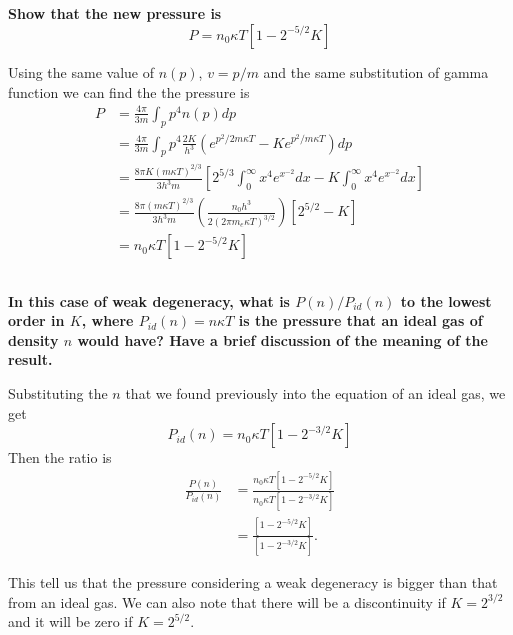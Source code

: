 \subsection{}
\textbf{Show that the new pressure is
\begin{equation}
    P = n_0\kappa T \left[1-2^{-5/2}K\right]
\end{equation}}

Using the same value of $n(p)$, $v=p/m$ and the same substitution of gamma function we can find the the pressure is
\begin{align*}
    P &= \frac{4\pi}{3m}\int_p p^4 n(p) dp\\
    &= \frac{4\pi}{3m}\int_p p^4 \frac{2K}{h^3}\left(e^{p^2/2m\kappa T}-Ke^{p^2/m\kappa T}\right) dp\\
    &= \frac{8\pi K(m\kappa T)^{2/3}}{3h^3m}\left[2^{5/3}\int_0^\infty x^4 e^{x^{-2}} dx - K\int_0^\infty x^4 e^{x^{-2}} dx\right]\\
    &= \frac{8\pi(m\kappa T)^{2/3}}{3h^3m}\left(\frac{n_0 h^3}{2(2\pi m_e \kappa T)^{3/2}}\right)\left[2^{5/2}-K\right]\\
    &= n_0\kappa T \left[1-2^{-5/2}K\right]
\end{align*}


\subsection{}
\textbf{In this case of weak degeneracy, what is $P(n)/P_{id}(n)$ to the lowest order in $K$, where $P_{id}(n) = n\kappa T$ is the pressure that an ideal gas of density $n$ would have?
Have a brief discussion of the meaning of the result.}

Substituting the $n$ that we found previously into the equation of an ideal gas, we get 
\begin{equation*}
    P_{id}(n) = n_0\kappa T \left[1-2^{-3/2}K\right]
\end{equation*}
 Then the ratio is
\begin{align*}
    \frac{P(n)}{P_{id}(n)} &= \frac{n_0\kappa T \left[1-2^{-5/2}K\right]}{n_0\kappa T \left[1-2^{-3/2}K\right]}\\
    &= \frac{\left[1-2^{-5/2}K\right]}{\left[1-2^{-3/2}K\right]}.
\end{align*}

This tell us that the pressure considering a weak degeneracy is bigger than that from an ideal gas. We can also note that there will be a discontinuity if $K=2^{3/2}$ and it will be zero if $K=2^{5/2}$. 


